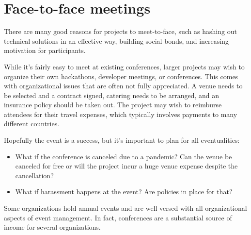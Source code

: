 


\chapter{Face-to-face meetings}

There are many good reasons for projects to meet-to-face, such as hashing out technical solutions in an effective way, building social bonds, and increasing motivation for participants.

While it's fairly easy to meet at existing conferences, larger projects may wish to organize their own hackathons, developer meetings, or conferences.  This comes with organizational issues that are often not fully appreciated.  A venue needs to be selected and a contract signed, catering needs to be arranged, and an insurance policy should be taken out.  The project may wish to reimburse attendees for their travel expenses, which typically involves payments to many different countries.

Hopefully the event is a success, but it's important to plan for all eventualities:

\begin{itemize}

\item What if the conference is canceled due to a pandemic? Can the venue be canceled for free or will the project incur a huge venue expense despite the cancellation?
\item What if harassment happens at the event?  Are policies in place for that?

\end{itemize}

Some organizations hold annual events and are well versed with all organizational aspects of event management.  In fact, conferences are a substantial source of income for several organizations.

